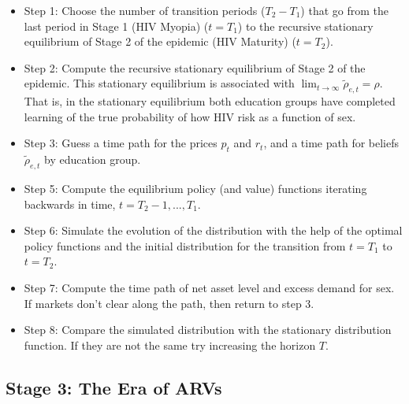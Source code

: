 \begin{itemize}
\item Step 1: Choose the number of transition periods ($T_2-T_1$) that go from the last  period in Stage 1 (HIV Myopia) ($t=T_1$) to the recursive stationary equilibrium of Stage 2 of the epidemic (HIV Maturity) ($t=T_2$).  
\item Step 2: Compute the recursive stationary equilibrium of Stage 2 of the epidemic. This stationary equilibrium is associated with $\lim_{t \rightarrow \infty }\widetilde{\rho}_{e,t}=\rho$. That is, in the stationary equilibrium both education groups have completed learning of the true probability of how HIV risk as a function of sex.
\item Step 3: Guess a time path for the prices $p_{t}$ and $r_{t}$, and a time path for beliefs $\widetilde{\rho}_{e,t}$ by education group.
\item Step 5: Compute the equilibrium policy (and value) functions iterating backwards in time, $t = T_2-1,...,T_1$.
\item Step 6: Simulate the evolution of the distribution with the help of the optimal policy functions and the initial distribution for the transition from $t = T_1$ to $t = T_2$. 
\item Step 7: Compute the time path of net asset level and excess demand for sex. If markets don't clear along the path, then return to step 3.
\item Step 8: Compare the simulated distribution  with the stationary distribution function. If they are not the same try increasing the horizon $T$.
\end{itemize}

\clearpage
\subsection*{\sf Stage 3: The Era of ARVs}



\clearpage






